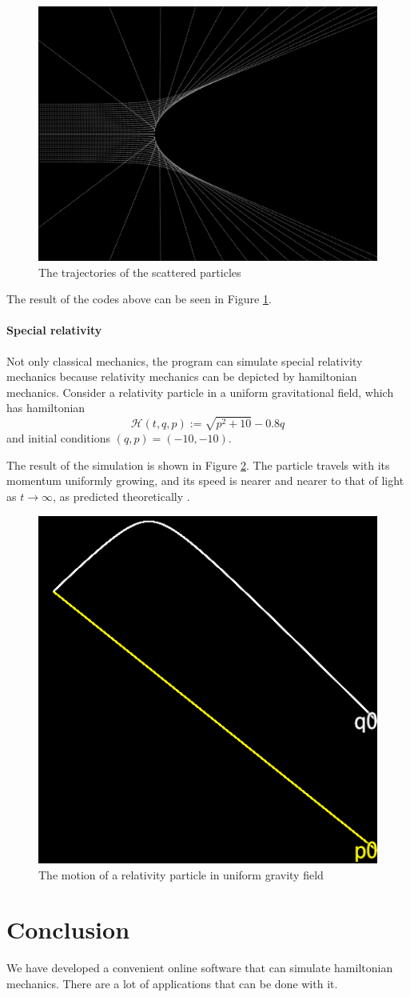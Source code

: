 \documentclass[12pt]{article}
\begin{document}
\begin{figure}[h]
  \centering
  \includegraphics[width=0.8\linewidth]{scatter.png}
  \caption{The trajectories of the scattered particles}
  \label{fig:scatter}
\end{figure}

The result of the codes above can be seen in Figure \ref{fig:scatter}.

\paragraph{Special relativity}

Not only classical mechanics, the program can simulate special relativity mechanics
because relativity mechanics can be depicted by hamiltonian mechanics.
Consider a relativity particle in a uniform gravitational field, which has hamiltonian \cite[p. 28]{landau2010fields}
\begin{equation*}
  \mathcal H\left(t,q,p\right):=\sqrt{p^2+10}-0.8q
\end{equation*}
and initial conditions $\left(q,p\right)=\left(-10,-10\right)$.

The result of the simulation is shown in Figure \ref{fig:relativity}.
The particle travels with its momentum uniformly growing,
and its speed is nearer and nearer to that of light as $t\rightarrow\infty$,
as predicted theoretically \cite[p. 24]{landau2010fields}.

\begin{figure}[h]
  \centering
  \includegraphics[width=0.4\linewidth]{relativity_gravity.png}
  \caption{The motion of a relativity particle in uniform gravity field}
  \label{fig:relativity}
\end{figure}

\section{Conclusion}

We have developed a convenient online software that can simulate hamiltonian mechanics.
There are a lot of applications that can be done with it.



\end{document}
